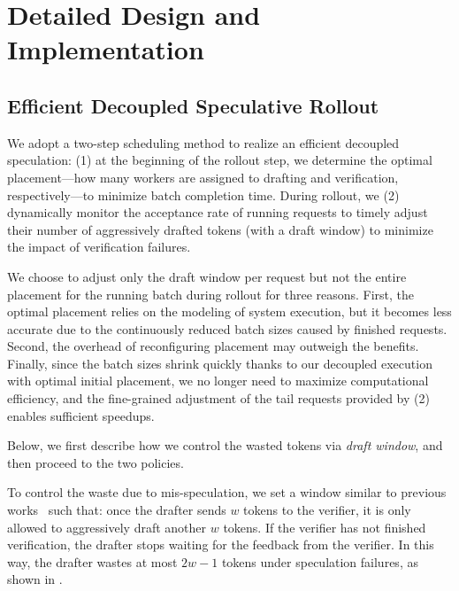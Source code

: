 \section{Detailed Design and Implementation}
\label{sec:design}


\subsection{Efficient Decoupled Speculative Rollout}
\label{sec:design-decouple}

We adopt a two-step scheduling method to realize an efficient 
decoupled speculation:
(1) at the beginning of the rollout step,
we determine the optimal placement---how many workers are assigned to
drafting and verification, respectively---to minimize 
batch completion time.
During rollout, we (2) dynamically monitor the acceptance
rate of running requests to timely adjust their number of 
aggressively drafted tokens (with a draft window)
to minimize the impact of verification failures.

We choose to adjust only the draft window per request
but not the entire placement for the running batch during rollout for
three reasons. First, the optimal placement relies on
the modeling of system execution, but it becomes less
accurate due to the continuously reduced batch sizes caused by finished requests.
Second, the overhead of reconfiguring placement may outweigh the benefits.
Finally, since the batch sizes shrink quickly thanks to our decoupled execution
with optimal initial placement,
we no longer need to maximize computational efficiency,
and the fine-grained adjustment of the tail requests provided by (2)
enables sufficient speedups.

Below, we first describe how we control the wasted
tokens via \emph{draft window}, and then proceed to the two policies. 


To control the waste due to mis-speculation,
we set a window similar to previous works~\cite{turbospec} such that:
once the drafter sends $w$ tokens to the
verifier,
it is only allowed to aggressively draft another $w$ tokens.
If the verifier has not finished verification,
the drafter stops waiting for the feedback from the verifier. 
In this way, the drafter wastes at most $2w - 1$ tokens under speculation failures,
as shown in {}.



